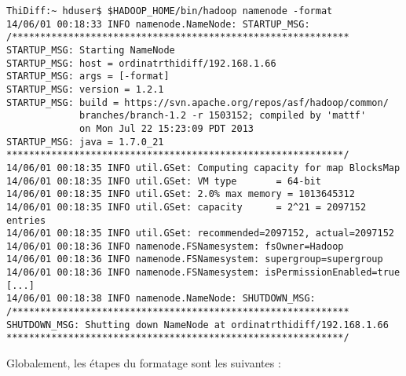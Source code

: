 \begin{verbatim}
ThiDiff:~ hduser$ $HADOOP_HOME/bin/hadoop namenode -format
14/06/01 00:18:33 INFO namenode.NameNode: STARTUP_MSG: 
/************************************************************
STARTUP_MSG: Starting NameNode
STARTUP_MSG: host = ordinatrthidiff/192.168.1.66
STARTUP_MSG: args = [-format]
STARTUP_MSG: version = 1.2.1
STARTUP_MSG: build = https://svn.apache.org/repos/asf/hadoop/common/
		     branches/branch-1.2 -r 1503152; compiled by 'mattf'
		     on Mon Jul 22 15:23:09 PDT 2013
STARTUP_MSG: java = 1.7.0_21
************************************************************/
14/06/01 00:18:35 INFO util.GSet: Computing capacity for map BlocksMap
14/06/01 00:18:35 INFO util.GSet: VM type       = 64-bit
14/06/01 00:18:35 INFO util.GSet: 2.0% max memory = 1013645312
14/06/01 00:18:35 INFO util.GSet: capacity      = 2^21 = 2097152 entries
14/06/01 00:18:35 INFO util.GSet: recommended=2097152, actual=2097152
14/06/01 00:18:36 INFO namenode.FSNamesystem: fsOwner=Hadoop
14/06/01 00:18:36 INFO namenode.FSNamesystem: supergroup=supergroup
14/06/01 00:18:36 INFO namenode.FSNamesystem: isPermissionEnabled=true
[...]
14/06/01 00:18:38 INFO namenode.NameNode: SHUTDOWN_MSG: 
/************************************************************
SHUTDOWN_MSG: Shutting down NameNode at ordinatrthidiff/192.168.1.66
************************************************************/
\end{verbatim}


\par Globalement, les étapes du formatage sont les suivantes :

